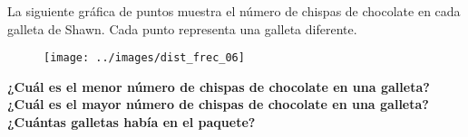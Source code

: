 \question[10] La siguiente gráfica de puntos muestra el número de chispas de chocolate en cada galleta de Shawn. Cada punto representa una galleta diferente.
\begin{figure}[H]
    \begin{center}
        \texttt{[image: ../images/dist\_frec\_06]}
    \end{center}
    \caption{}
    \label{fig:dist_frec_06}
\end{figure}
\textbf{¿Cuál es el menor número de chispas de chocolate en una galleta?}\\
\textbf{¿Cuál es el mayor número de chispas de chocolate en una galleta?}\\
\textbf{¿Cuántas galletas había en el paquete?}
